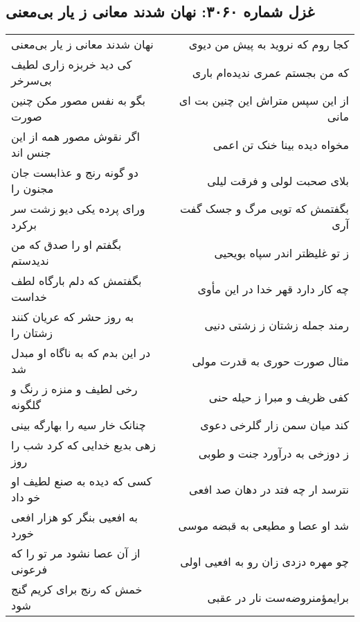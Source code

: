 \begin{center}
\section*{غزل شماره ۳۰۶۰: نهان شدند معانی ز یار بی‌معنی}
\label{sec:3060}
\begin{longtable}{l p{0.5cm} r}
نهان شدند معانی ز یار بی‌معنی
&&
کجا روم که نروید به پیش من دیوی
\\
کی دید خربزه زاری لطیف بی‌سرخر
&&
که من بجستم عمری ندیده‌ام باری
\\
بگو به نفس مصور مکن چنین صورت
&&
از این سپس متراش این چنین بت ای مانی
\\
اگر نقوش مصور همه از این جنس اند
&&
مخواه دیده بینا خنک تن اعمی
\\
دو گونه رنج و عذابست جان مجنون را
&&
بلای صحبت لولی و فرقت لیلی
\\
ورای پرده یکی دیو زشت سر برکرد
&&
بگفتمش که تویی مرگ و جسک گفت آری
\\
بگفتم او را صدق که من ندیدستم
&&
ز تو غلیظتر اندر سپاه بویحیی
\\
بگفتمش که دلم بارگاه لطف خداست
&&
چه کار دارد قهر خدا در این مأوی
\\
به روز حشر که عریان کنند زشتان را
&&
رمند جمله زشتان ز زشتی دنیی
\\
در این بدم که به ناگاه او مبدل شد
&&
مثال صورت حوری به قدرت مولی
\\
رخی لطیف و منزه ز رنگ و گلگونه
&&
کفی ظریف و مبرا ز حیله حنی
\\
چنانک خار سیه را بهارگه بینی
&&
کند میان سمن زار گلرخی دعوی
\\
زهی بدیع خدایی که کرد شب را روز
&&
ز دوزخی به درآورد جنت و طوبی
\\
کسی که دیده به صنع لطیف او خو داد
&&
نترسد ار چه فتد در دهان صد افعی
\\
به افعیی بنگر کو هزار افعی خورد
&&
شد او عصا و مطیعی به قبضه موسی
\\
از آن عصا نشود مر تو را که فرعونی
&&
چو مهره دزدی زان رو به افعیی اولی
\\
خمش که رنج برای کریم گنج شود
&&
برایمؤمنروضه‌ست نار در عقبی
\\
\end{longtable}
\end{center}
